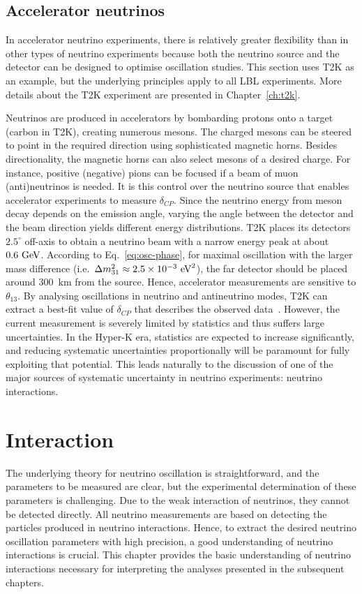\subsection{Accelerator neutrinos}
In accelerator neutrino experiments, there is relatively greater flexibility than in other types of neutrino experiments because both the neutrino source and the detector can be designed to optimise oscillation studies.
This section uses T2K as an example, but the underlying principles apply to all LBL experiments.
More details about the T2K experiment are presented in Chapter~\ref{ch:t2k}.

Neutrinos are produced in accelerators by bombarding protons onto a target (carbon in T2K), creating numerous mesons.
The charged mesons can be steered to point in the required direction using sophisticated magnetic horns.
Besides directionality, the magnetic horns can also select mesons of a desired charge.
For instance, positive (negative) pions can be focused if a beam of muon (anti)neutrinos is needed.
It is this control over the neutrino source that enables accelerator experiments to measure $\delta_{CP}$.
Since the neutrino energy from meson decay depends on the emission angle, varying the angle between the detector and the beam direction yields different energy distributions.
T2K places its detectors $2.5^\circ$ off-axis to obtain a neutrino beam with a narrow energy peak at about $0.6~\textrm{GeV}$.
According to Eq.~\ref{eq:osc-phase}, for maximal oscillation with the larger mass difference (i.e.\ $\Delta m^2_{31} \approx 2.5 \times 10^{-3}~\textrm{eV}^2$), the far detector should be placed around $300$~km from the source.
Hence, accelerator measurements are sensitive to $\theta_{13}$.
By analysing oscillations in neutrino and antineutrino modes, T2K can extract a best-fit value of $\delta_{CP}$ that describes the observed data~\cite{T2K:2019bcf}.
However, the current measurement is severely limited by statistics and thus suffers large uncertainties.
In the Hyper-K era, statistics are expected to increase significantly, and reducing systematic uncertainties proportionally will be paramount for fully exploiting that potential.
This leads naturally to the discussion of one of the major sources of systematic uncertainty in neutrino experiments: neutrino interactions.

\section{Interaction}
\label{sec:interaction}
The underlying theory for neutrino oscillation is straightforward, and the parameters to be measured are clear, but the experimental determination of these parameters is challenging.
Due to the weak interaction of neutrinos, they cannot be detected directly.
All neutrino measurements are based on detecting the particles produced in neutrino interactions.
Hence, to extract the desired neutrino oscillation parameters with high precision, a good understanding of neutrino interactions is crucial.
This chapter provides the basic understanding of neutrino interactions necessary for interpreting the analyses presented in the subsequent chapters.

